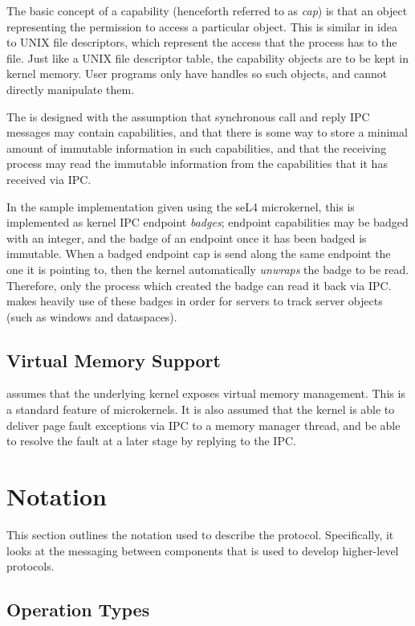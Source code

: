 The basic concept of a capability (henceforth referred to as \emph{cap}) is that
an object representing the permission to access a particular object. This is
similar in idea to UNIX file descriptors, which represent the access that the
process has to the file. Just like a UNIX file descriptor table, the capability
objects are to be kept in kernel memory. User programs only have handles so
such objects, and cannot directly manipulate them.

The  is designed with the assumption that synchronous call and reply IPC
messages may contain capabilities, and that there is some way to store a
minimal amount of immutable information in such capabilities, and that the
receiving process may read the immutable information from the capabilities that
it has received via IPC. 

In the sample implementation given using the seL4 microkernel, this is
implemented as kernel IPC endpoint \emph{badges}; endpoint capabilities may be
badged with an integer, and the badge of an endpoint once it has been badged is
immutable. When a badged endpoint cap is send along the same endpoint the one
it is pointing to, then the kernel automatically \emph{unwraps} the badge to be
read. Therefore, only the process which created the badge can read it back via
IPC.  makes heavily use of these badges in order for servers to track
server objects (such as windows and dataspaces).

\subsection{Virtual Memory Support}

 assumes that the underlying kernel exposes virtual memory management.
This is a standard feature of microkernels. It is also assumed that the kernel
is able to deliver page fault exceptions via IPC to a memory manager thread,
and be able to resolve the fault at a later stage by replying to the IPC.

\section{Notation}

This section outlines the notation used to describe the  protocol.
Specifically, it looks at the messaging between components that is used to
develop higher-level protocols. 

\subsection{Operation Types} 

